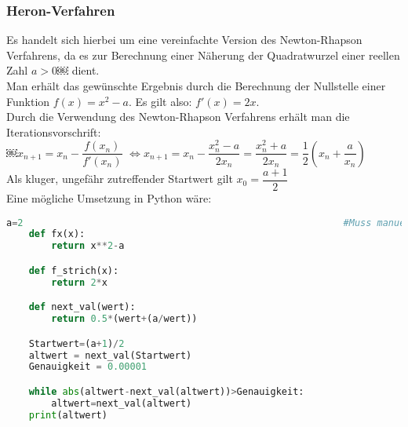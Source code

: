 \subsubsection{Heron-Verfahren}
Es handelt sich hierbei um eine vereinfachte Version des Newton-Rhapson Verfahrens, da es zur Berechnung einer Näherung der Quadratwurzel einer reellen Zahl $a>0$￼ dient.\\
Man erhält das gewünschte Ergebnis durch die Berechnung der Nullstelle einer Funktion $f(x)=x^{2}-a$. Es gilt also: $f'(x)=2x$.\\
Durch die Verwendung des Newton-Rhapson Verfahrens erhält man die Iterationsvorschrift:\\
￼$x_{n+1}=x_{n}-\dfrac{f(x_{n})}{f'(x_{n})}$
$\Leftrightarrow x_{n+1}=x_{n}-\dfrac{x_{n}^{2}-a}{2x_{n}}=\dfrac{x_{n}^{2}+a}{2x_{n}}=\dfrac{1}{2}\left(x_{n}+\dfrac{a}{x_{n}}\right)$\\
Als kluger, ungefähr zutreffender Startwert gilt $x_0=\dfrac{a+1}{2}$\\
Eine mögliche Umsetzung in Python wäre:\\

\begin{lstlisting}[language=Python]
	a=2															#Muss manuell angegeben werden
	def fx(x):
		return x**2-a

	def f_strich(x):
		return 2*x

	def next_val(wert):
		return 0.5*(wert+(a/wert))

	Startwert=(a+1)/2
	altwert = next_val(Startwert)
	Genauigkeit = 0.00001

	while abs(altwert-next_val(altwert))>Genauigkeit:
		altwert=next_val(altwert)
	print(altwert)
\end{lstlisting}

